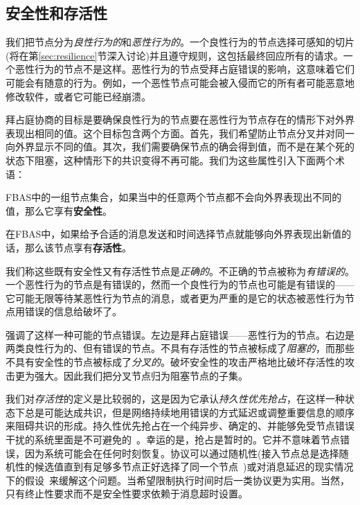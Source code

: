 \subsection{安全性和存活性}\label{sec:fba-safe-live}

我们把节点分为\textit{良性行为的}和\textit{恶性行为的}。一个良性行为的节点选择可感知的{\quorum}切片(将在第\ref{sec:resilience}节深入讨论)并且遵守规则，这包括最终回应所有的请求。一个恶性行为的节点不是这样。恶性行为的节点受拜占庭错误的影响，这意味着它们可能会有随意的行为。例如，一个恶性节点可能会被入侵而它的所有者可能恶意地修改软件，或者它可能已经崩溃。

拜占庭协商的目标是要确保良性行为的节点要在恶性行为节点存在的情形下对外界表现出相同的值。这个目标包含两个方面。首先，我们希望防止节点分叉并对同一{\slot}向外界显示不同的值。其次，我们需要确保节点的确会得到值，而不是在某个死的状态下阻塞，这种情形下的共识变得不再可能。我们为这些属性引入下面两个术语：

\begin{definition}[安全性]
	FBAS中的一组节点集合，如果当中的任意两个节点都不会向外界表现出不同的值，那么它享有{\textbf{安全性}}。
\end{definition}

\begin{definition}[存活性]
	在FBAS中，如果给予合适的消息发送和时间选择节点就能够向外界表现出新值的话，那么该节点享有{\textbf{存活性}}。
\end{definition}

我们称这些既有安全性又有存活性节点是\textit{正确的}。不正确的节点被称为{\textit{有错误的}}。一个恶性行为的节点是有错误的，然而一个良性行为的节点也可能是有错误的——它可能无限等待某恶性行为节点的消息，或者更为严重的是它的状态被恶性行为节点用错误的信息给破坏了。

强调了这样一种可能的节点错误。左边是拜占庭错误——恶性行为的节点。右边是两类良性行为的、但有错误的节点。不具有存活性的节点被标成了\textit{阻塞的}，而那些不具有安全性的节点被标成了\textit{分叉的}。破坏安全性的攻击严格地比破坏存活性的攻击更为强大。因此我们把分叉节点归为阻塞节点的子集。

我们对\textit{存活性}的定义是比较弱的，这是因为它承认\textit{持久性优先抢占}，在这样一种状态下总是可能达成共识，但是网络持续地用错误的方式延迟或调整重要信息的顺序来阻碍共识的形成。持久性优先抢占在一个纯异步、确定的、并能够免受节点错误干扰的系统里面是不可避免的~\cite{Fischer:1985:IDC:3149.214121}。幸运的是，抢占是暂时的。它并不意味着节点错误，因为系统可能会在任何时刻恢复。协议可以通过随机性(接入节点总是选择随机性的候选值直到有足够多节点正好选择了同一个节点~\cite{Ben-Or:1983:AFC:800221.806707,Bracha:1985:ACB:4221.214134})或对消息延迟的现实情况下的假设~\cite{Dwork:1988:CPP:42282.42283}来缓解这个问题。当希望限制执行时间时后一类协议更为实用。当然，只有终止性要求而不是安全性要求依赖于消息超时设置。



